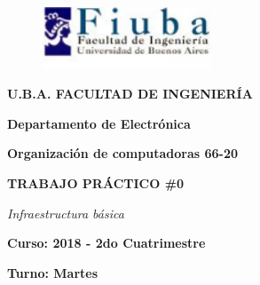 \documentclass[10pt,a4paper]{article}
\author{cyn}
\begin{document}
\begin{titlepage}
\begin{center}
\vspace*{-1in}
\begin{figure}[htb]
\begin{flushleft}
\includegraphics[width=5cm]{./logo}
\end{flushleft}
\end{figure}
\begin{LARGE}
\textbf{U.B.A. FACULTAD DE INGENIERÍA}\\
\end{LARGE}
\vspace*{0.15in}
\begin{LARGE}
\textbf{Departamento de Electrónica}\\
\end{LARGE}
\vspace*{0.2in}
\begin{LARGE}
\textbf{Organización de computadoras 66-20}\\
\end{LARGE}
\vspace*{0.2in}
\begin{Large}
\textbf{TRABAJO PRÁCTICO \#0}\\
\end{Large}
\vspace*{0.2in}
\begin{LARGE}
\textit{Infraestructura básica }\\
\end{LARGE}
\vspace*{0.2in}
\begin{Large}
\raggedright\textbf{Curso: 2018 - 2do Cuatrimestre}\\
\end{Large}
\vspace*{0.1in}
\begin{Large}
\raggedright\textbf{Turno: Martes}\\
\end{Large}
\vspace*{0.1in}


\end{center}
\end{titlepage}
\end{document}
